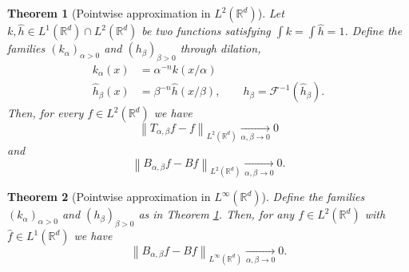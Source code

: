 \documentclass[10pt,a4paper]{amsart}
\newtheorem{theorem}{Theorem}
\newcommand{\R}{\mathbb{R}}
\newcommand{\fhat}[1]{\widehat{#1}}
\newcommand{\norm}[1]{\left\lVert#1\right\rVert}
\begin{document}
\begin{theorem}[Pointwise approximation in \(L^2(\R^d)\)]
\label{thm:regfouriermult_pwl2approx}
    Let \(k,\fhat{h}\in L^1(\R^d)\cap L^2(\R^d)\) be two functions satisfying \(\int k = \int \fhat{h} = 1\).
    Define the families \((k_\alpha)_{\alpha>0}\) and \((h_\beta)_{\beta>0}\)
    through dilation,
    \begin{align}
    \label{eq:approxiddilate_k}
        k_\alpha(x) &= \alpha^{-n} k(x/\alpha)\\
    \label{eq:approxiddilate_h}
        \fhat{h}_\beta(x) &= \beta^{-n} \fhat{h}(x/\beta),\qquad h_\beta = \mathcal{F}^{-1}(\fhat{h}_\beta).
    \end{align}
    Then, for every \(f\in L^2(\R^d)\) we have
    \begin{equation*}
        \norm{T_{\alpha,\beta}f - f}_{L^2(\R^d)}\xrightarrow[\alpha,\beta\to 0]{} 0
    \end{equation*}
    and
    \begin{equation*}
        \norm{B_{\alpha,\beta}f - Bf}_{L^2(\R^d)}\xrightarrow[\alpha,\beta\to 0]{} 0.
    \end{equation*}
\end{theorem}

\begin{theorem}[Pointwise approximation in \(L^\infty(\R^d)\)]
\label{thm:regfouriermult_pwuniformapprox}
    Define the families \((k_\alpha)_{\alpha>0}\) and \((h_\beta)_{\beta>0}\) as in Theorem \ref{thm:regfouriermult_pwl2approx}.
    Then, for any \(f\in L^2(\R^d)\) with \(\fhat{f}\in L^1(\R^d)\) we have
    \begin{equation*}
        \norm{B_{\alpha,\beta}f - Bf}_{L^\infty(\R^d)}\xrightarrow[\alpha,\beta\to 0]{} 0.
    \end{equation*}
\end{theorem}
\end{document}
